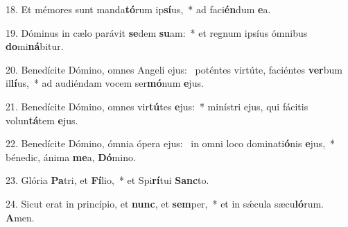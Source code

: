 18. Et mémores sunt manda\textbf{tó}rum ip\textbf{sí}us,~*  ad faci\textbf{én}dum \textbf{e}a.\

19. Dóminus in cælo parávit \textbf{se}dem \textbf{su}am:~*  et regnum ipsíus ómnibus \textbf{do}mi\textbf{ná}bitur.\

20. Benedícite Dómino, omnes Angeli ejus: \dag\  poténtes virtúte, faciéntes \textbf{ver}bum il\textbf{lí}us,~*  ad audiéndam vocem ser\textbf{mó}num \textbf{e}jus.\

21. Benedícite Dómino, omnes vir\textbf{tú}tes \textbf{e}jus:~*  minístri ejus, qui fácitis volun\textbf{tá}tem \textbf{e}jus.\

22. Benedícite Dómino, ómnia ópera ejus: \dag\  in omni loco dominati\textbf{ó}nis \textbf{e}jus,~*  bénedic, ánima \textbf{me}a, \textbf{Dó}mino.\

23. Glória \textbf{Pa}tri, et \textbf{Fí}lio,~*  et Spi\textbf{rí}tui \textbf{Sanc}to.\

24. Sicut erat in princípio, et \textbf{nunc}, et \textbf{sem}per,~*  et in sǽcula sæcu\textbf{ló}rum. \textbf{A}men.\

